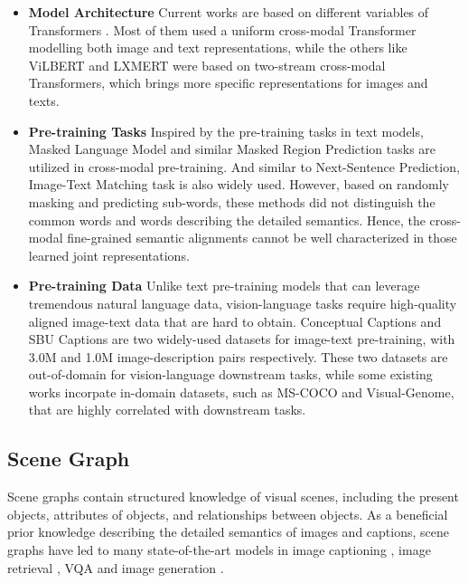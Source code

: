 \documentclass[letterpaper]{article} \usepackage{aaai21}  \usepackage{times}  \usepackage{helvet} \usepackage{courier}  \usepackage[hyphens]{url}  \usepackage{graphicx} \urlstyle{rm} \def\UrlFont{\rm}  \usepackage{natbib}  \usepackage{caption} \frenchspacing  \setlength{\pdfpagewidth}{8.5in}  \setlength{\pdfpageheight}{11in}  \usepackage{cite}
\begin{document}
\begin{itemize}
 \item \textbf{Model Architecture} Current works are based on different variables of Transformers \cite{vaswani2017attention}. Most of them \cite{li2019unicoder,su2019vl,zhou2019unified,li2019visualbert,huang2020pixel} used a uniform cross-modal Transformer modelling both image and text representations, while the others like ViLBERT \cite{lu2019vilbert} and LXMERT \cite{tan2019lxmert} were based on two-stream cross-modal Transformers, which brings more specific representations for images and texts. 

\item \textbf{Pre-training Tasks} Inspired by the pre-training tasks in text  models, Masked Language Model and similar Masked Region Prediction tasks \cite{lu2019vilbert} are utilized in cross-modal pre-training. And similar to Next-Sentence Prediction, Image-Text Matching \cite{lu2019vilbert,su2019vl,chen2019uniter} task is also widely used. However, based on randomly masking and predicting sub-words, these methods did not distinguish the common words and words describing the detailed semantics. Hence, the  cross-modal fine-grained semantic alignments cannot be well characterized in those learned joint representations.

\item \textbf{Pre-training Data} Unlike text pre-training models that can leverage tremendous natural language data, vision-language tasks require high-quality aligned image-text data that are hard to obtain. Conceptual Captions\cite{sharma2018conceptual} and SBU Captions\cite{ordonez2011im2text} are two widely-used datasets for image-text pre-training, with 3.0M and 1.0M image-description pairs respectively. These two datasets are out-of-domain for vision-language downstream tasks, while some existing works \cite{chen2019uniter,huang2020pixel}  incorpate in-domain datasets, such as MS-COCO  and Visual-Genome, that are highly correlated with downstream tasks.
\end{itemize}

\subsection{Scene Graph}

Scene graphs contain structured knowledge of visual scenes, including the present objects, attributes of objects, and relationships between objects. As a beneficial prior knowledge describing the detailed semantics of images and captions, scene graphs have led to many state-of-the-art models in image captioning \cite{yang2019auto}, image retrieval \cite{wu2019unified}, VQA \cite{zhang2019empirical} and image generation \cite{johnson2018image}.
\end{document}
